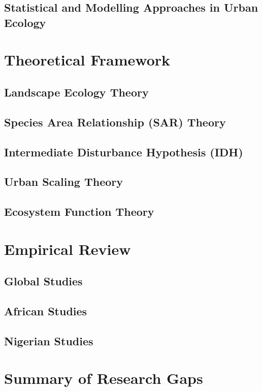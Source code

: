 \subsection{Statistical and Modelling Approaches in Urban Ecology}
\label{subsection:1-2-7}
\section{Theoretical Framework}
\label{section:1-3}
\subsection{Landscape Ecology Theory}
\label{subsection:1-3-1}
\subsection{Species Area Relationship (SAR) Theory}
\label{subsection:1-3-2}
\subsection{Intermediate Disturbance Hypothesis (IDH)}
\label{subsection:1-3-3}
\subsection{Urban Scaling Theory}
\label{subsection:1-3-4}
\subsection{Ecosystem Function Theory}
\label{subsection:1-3-5}
\section{Empirical Review}
\label{section:1-4}
\subsection{Global Studies}
\label{subsection:1-4-1}
\subsection{African Studies}
\label{subsection:1-4-2}
\subsection{Nigerian Studies}
\label{subsection:1-4-3}
\section{Summary of Research Gaps}
\label{section:1-5}
